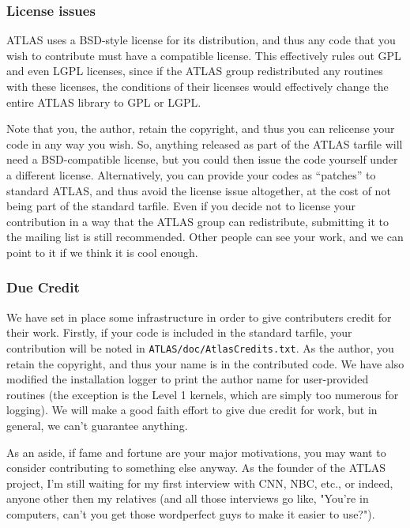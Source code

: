 \documentclass[11pt]{article}
\begin{document}
\subsubsection{License issues}

ATLAS uses a BSD-style license for its distribution, and thus any code
that you wish to contribute must have a compatible license.  This effectively
rules out GPL and even LGPL licenses, since if the ATLAS group redistributed
any routines with these licenses, the conditions of their licenses would
effectively change the entire ATLAS library to GPL or LGPL.

Note that you, the author, retain the copyright, and thus you can relicense
your code in any way you wish.  So, anything released as part of the ATLAS
tarfile will need a BSD-compatible license, but you could then issue the
code yourself under a different license.  Alternatively, you can provide
your codes as ``patches'' to standard ATLAS, and thus avoid the license
issue altogether, at the cost of not being part of the standard tarfile.
Even if you decide not to license your contribution in a way that the
ATLAS group can redistribute, submitting it to the mailing list is still
recommended.  Other people can see your work, and we can point to it if
we think it is cool enough.

\subsubsection{Due Credit}

We have set in place some infrastructure in order to give contributers
credit for their work.  Firstly, if your code is included in the standard
tarfile, your contribution will be noted in {\tt ATLAS/doc/AtlasCredits.txt}.
As the author, you retain the copyright, and thus your name is in the
contributed code.
We have also modified the installation logger to print the author name
for user-provided routines (the exception is the Level 1 kernels, which are
simply too numerous for logging).  We will make a good faith effort to give
due credit for work, but in general, we can't guarantee anything.

As an aside, if fame and fortune are your major motivations, you may 
want to consider contributing to something else anyway.  As the founder
of the ATLAS project, I'm still waiting for my first interview with CNN,
NBC, etc., or indeed, anyone other then my relatives (and all those
interviews go like, "You're in computers, can't you get those wordperfect
guys to make it easier to use?").
\end{document}

